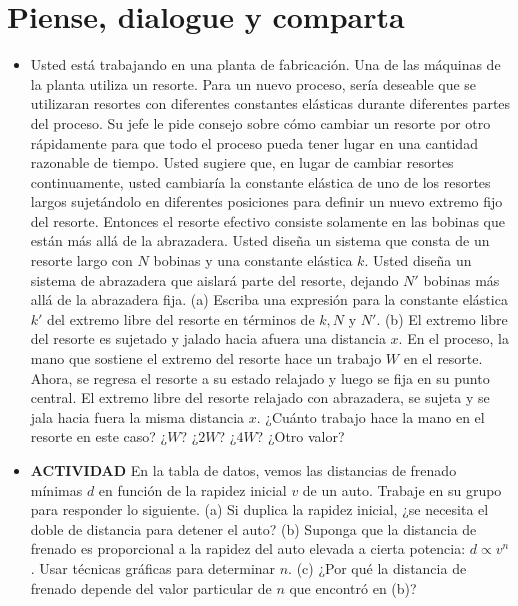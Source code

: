 \documentclass[11pt,a4paper]{article}
\begin{document}
\section*{Piense, dialogue y comparta}

\begin{itemize}
    \item[\textbf{1.}] Usted está trabajando en una planta de fabricación. Una de las máquinas de la planta utiliza un resorte. Para un nuevo proceso, sería deseable que se utilizaran resortes con diferentes constantes elásticas durante diferentes partes del proceso. Su jefe le pide consejo sobre cómo cambiar un resorte por otro rápidamente para que todo el proceso pueda tener lugar en una cantidad razonable de tiempo. Usted sugiere que, en lugar de cambiar resortes continuamente, usted cambiaría la constante elástica de uno de los resortes largos sujetándolo en diferentes posiciones para definir un nuevo extremo fijo del resorte. Entonces el resorte efectivo consiste solamente en las bobinas que están más allá de la abrazadera. Usted diseña un sistema que consta de un resorte largo con $N$ bobinas y una constante elástica $k$. Usted diseña un sistema de abrazadera que aislará parte del resorte, dejando $N'$ bobinas más allá de la abrazadera fija. (a) Escriba una expresión para la constante elástica $k'$ del extremo libre del resorte en términos de $k, N$ y $N'$. (b) El extremo libre del resorte es sujetado y jalado hacia afuera una distancia $x$. En el proceso, la mano que sostiene el extremo del resorte hace un trabajo $W$ en el resorte. Ahora, se regresa el resorte a su estado relajado y luego se fija en su punto central. El extremo libre del resorte relajado con abrazadera, se sujeta y se jala hacia fuera la misma distancia $x$. ¿Cuánto trabajo hace la mano en el resorte en este caso? ¿$W$? ¿$2W$? ¿$4W$? ¿Otro valor?
    \vspace*{9cm}

    \item[\textbf{2.}] \textbf{ACTIVIDAD} En la tabla de datos, vemos las distancias de frenado mínimas $d$ en función de la rapidez inicial $v$ de un auto. Trabaje en su grupo para responder lo siguiente. (a) Si duplica la rapidez inicial, ¿se necesita el doble de distancia para detener el auto? (b) Suponga que la distancia de frenado es proporcional a la rapidez del auto elevada a cierta potencia: $d \propto v^n$. Usar técnicas gráficas para determinar $n$. (c) ¿Por qué la distancia de frenado depende del valor particular de $n$ que encontró en (b)?
    

\end{itemize}
\end{document}
